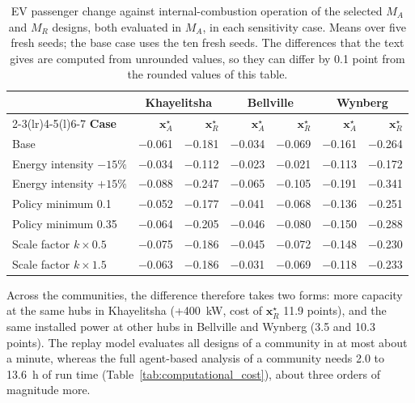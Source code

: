 \documentclass{elsarticle}
\newcommand{\MR}{\ensuremath{M_R}}
\newcommand{\MA}{\ensuremath{M_A}}
\newcommand{\xR}{\ensuremath{\mathbf{x}_R^{\star}}}
\newcommand{\xA}{\ensuremath{\mathbf{x}_A^{\star}}}
\begin{document}
\begin{table}[htbp]
    \centering
    \footnotesize
    \caption[EV passenger change in sensitivity cases]{EV passenger change against internal-combustion operation of the selected \MA{} and \MR{} designs, both evaluated in \MA, in each sensitivity case. Means over five fresh seeds; the base case uses the ten fresh seeds. The differences that the text gives are computed from unrounded values, so they can differ by 0.1 point from the rounded values of this table.}
    \label{tab:sensitivity}
    \begin{tabularx}{\linewidth}{@{}Xrrrrrr@{}}
        \toprule
        & \multicolumn{2}{c}{Khayelitsha} & \multicolumn{2}{c}{Bellville} & \multicolumn{2}{c}{Wynberg} \\
        \cmidrule(lr){2-3}\cmidrule(lr){4-5}\cmidrule(l){6-7}
        \textbf{Case} & $\xA$ & $\xR$ & $\xA$ & $\xR$ & $\xA$ & $\xR$ \\
        \midrule
        Base & $-$0.061 & $-$0.181 & $-$0.034 & $-$0.069 & $-$0.161 & $-$0.264 \\
        Energy intensity $-15\%$ & $-$0.034 & $-$0.112 & $-$0.023 & $-$0.021 & $-$0.113 & $-$0.172 \\
        Energy intensity $+15\%$ & $-$0.088 & $-$0.247 & $-$0.065 & $-$0.105 & $-$0.191 & $-$0.341 \\
        Policy minimum 0.1 & $-$0.052 & $-$0.177 & $-$0.041 & $-$0.068 & $-$0.136 & $-$0.251 \\
        Policy minimum 0.35 & $-$0.064 & $-$0.205 & $-$0.046 & $-$0.080 & $-$0.150 & $-$0.288 \\
        Scale factor $k \times 0.5$ & $-$0.075 & $-$0.186 & $-$0.045 & $-$0.072 & $-$0.148 & $-$0.230 \\
        Scale factor $k \times 1.5$ & $-$0.063 & $-$0.186 & $-$0.031 & $-$0.069 & $-$0.118 & $-$0.233 \\
        \bottomrule
    \end{tabularx}
\end{table}

Across the communities, the difference therefore takes two forms: more capacity at the same hubs in Khayelitsha (+400~kW, cost of \(\xR\) 11.9 points), and the same installed power at other hubs in Bellville and Wynberg (3.5 and 10.3 points). The replay model evaluates all designs of a community in at most about a minute, whereas the full agent-based analysis of a community needs 2.0 to 13.6~h of run time (Table~\ref{tab:computational_cost}), about three orders of magnitude more.
\end{document}
